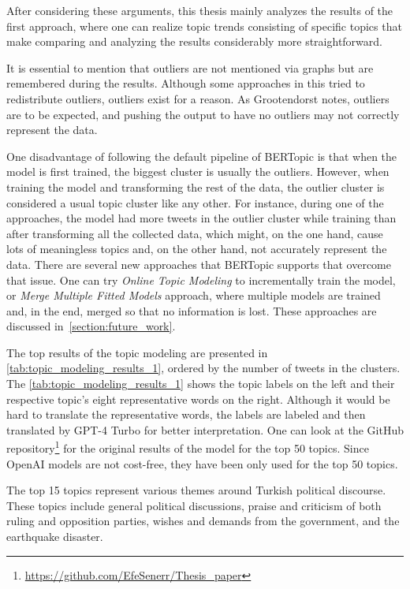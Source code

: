 After considering these arguments, this thesis mainly analyzes the results of the first approach, 
where one can realize topic trends consisting of specific topics that make comparing and analyzing 
the results considerably more straightforward.

It is essential to mention that outliers are not mentioned via graphs but are remembered 
during the results. Although some approaches in this tried to redistribute outliers, outliers 
exist for a reason. As Grootendorst notes, outliers are to be expected, and pushing the 
output to have no outliers may not correctly represent the data. 

One disadvantage of following the default pipeline of BERTopic is that when the model is first trained, 
the biggest cluster is usually the outliers. However, when training the model and transforming 
the rest of the data, the outlier cluster is considered a usual topic cluster like any other. 
For instance, during one of the approaches, the model had more tweets in the outlier cluster 
while training than after transforming all the collected data, which might, on the one hand, 
cause lots of meaningless topics and, on the other hand, not accurately represent the data. 
There are several new approaches that BERTopic supports that overcome that issue. 
One can try \textit{Online Topic Modeling} to incrementally train the model, or 
\textit{Merge Multiple Fitted Models} approach, where multiple models are trained and, in the end, 
merged so that no information is lost. These approaches are discussed in~\autoref{section:future_work}.
% 

The top results of the topic modeling are presented in \autoref{tab:topic_modeling_results_1}, 
ordered by the number of tweets in the clusters. The \autoref{tab:topic_modeling_results_1} shows 
the topic labels on the left and their respective topic's eight representative words on the right. 
Although it would be hard to translate the representative words, the labels are labeled and then 
translated by GPT-4 Turbo for better interpretation. One can look at the GitHub repository\footnote{\url{https://github.com/EfeSenerr/Thesis_paper}} 
for the original results of the model for the top 50 topics. Since OpenAI models are not cost-free, 
they have been only used for the top 50 topics.

The top 15 topics represent various themes around Turkish political discourse. These topics include 
general political discussions, praise and criticism of both ruling and opposition parties, 
wishes and demands from the government, and the earthquake disaster. 


